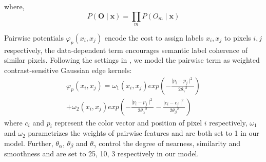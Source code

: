where, 
\begin{equation}
\label{eq:3}
P\left(\mathbf {O} \mid \mathbf{x}\right)=\prod _{m}{P\left(O_m\mid \mathbf{x}\right)} 
\end{equation}



Pairwise potentials $\varphi_p\left(x_i, x_j\right)$ encode the cost to assign labels $x_i, x_j$ to pixels $i, j$ respectively, the data-dependent term encourages semantic label coherence of similar pixels. Following the settings in \cite{crf2012}, we model the pairwise term as weighted contrast-sensitive Gaussian edge kernels: 
\begin{multline} \label{eq:4}
\varphi_p\left(x_i,x_j\right) = \omega_1\left(x_i,x_j\right) exp\left(-\frac{\mid p_i-p_j\mid ^2}{2{\theta_\gamma}^2}\right) \\
 +\omega_2\left(x_i,x_j\right) exp\left(-\frac{\mid p_i-p_j\mid ^2}{2{\theta_\alpha}^2} -\frac{\mid c_i-c_j\mid ^2}{2{\theta_\beta}^2} \right)
\end{multline}
where $c_i$ and $p_i$ represent the color vector and position of pixel $i$ respectively, $\omega_1$ and $\omega_2$ parametrizes the weights of pairwise features and are both set to 1 in our model. Further, $\theta_\alpha$, $\theta_\beta$ and $\theta_\gamma$ control the degree of nearness, similarity and smoothness and are set to 25, 10, 3 respectively in our model.

